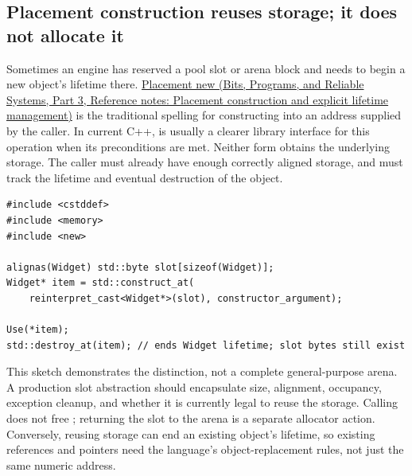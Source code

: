 \subsection{Placement construction reuses storage; it does not allocate it}\label{05-engine-i-ch004-placement-construction-reuses-storage-it-does-not-allocate-it}

\hypertarget{05-engine-i-ch004-placement-construction-reuses-storage-it-does-not-allocate-it}{}

Sometimes an engine has reserved a pool slot or arena block and needs to begin a new object's lifetime there. \href{../01-Bits-Programs-and-Reliable-Systems-P03/main.pdf\#appendix-f56c3e43fd4e}{Placement new (Bits, Programs, and Reliable Systems, Part 3, Reference notes: Placement construction and explicit lifetime management)} is the traditional spelling for constructing into an address supplied by the caller. In current C++,  is usually a clearer library interface for this operation when its preconditions are met. Neither form obtains the underlying storage. The caller must already have enough correctly aligned storage, and must track the lifetime and eventual destruction of the object.

\begin{verbatim}
#include <cstddef>
#include <memory>
#include <new>

alignas(Widget) std::byte slot[sizeof(Widget)];
Widget* item = std::construct_at(
    reinterpret_cast<Widget*>(slot), constructor_argument);

Use(*item);
std::destroy_at(item); // ends Widget lifetime; slot bytes still exist
\end{verbatim}

This sketch demonstrates the distinction, not a complete general-purpose arena. A production slot abstraction should encapsulate size, alignment, occupancy, exception cleanup, and whether it is currently legal to reuse the storage. Calling  does not free ; returning the slot to the arena is a separate allocator action. Conversely, reusing storage can end an existing object's lifetime, so existing references and pointers need the language's object-replacement rules, not just the same numeric address.

